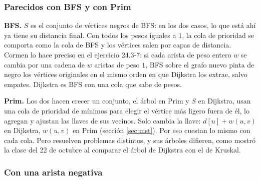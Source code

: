 \documentclass[11pt,letterpaper]{article}
\begin{document}
\subsubsection*{Parecidos con BFS y con Prim}

\textbf{BFS.} $S$ es el conjunto de vértices negros de BFS: en los
dos casos, lo que está ahí ya tiene su distancia final. Con todos los
pesos iguales a $1$, la cola de prioridad se comporta como la cola de
BFS y los vértices salen por capas de distancia. Cormen lo hace
preciso en el ejercicio 24.3-7: si cada arista de peso entero $w$ se
cambia por una cadena de $w$ aristas de peso $1$, BFS sobre el grafo
nuevo pinta de negro los vértices originales en el mismo orden en que
Dijkstra los extrae, salvo empates. Dijkstra es BFS con una cola que
sabe de pesos.

\textbf{Prim.} Los dos hacen crecer un conjunto, el árbol en Prim y
$S$ en Dijkstra, usan una cola de prioridad de mínimos para elegir el
vértice más ligero fuera de él, lo agregan y ajustan las llaves de
sus vecinos. Solo cambia la llave: $d[u] + w(u, v)$ en Dijkstra,
$w(u, v)$ en Prim (sección \ref{sec:mst}). Por eso cuestan lo mismo
con cada cola. Pero resuelven problemas distintos, y sus árboles
difieren, como mostró la clase del 22 de octubre al comparar el árbol
de Dijkstra con el de Kruskal.

\subsubsection*{Con una arista negativa}
\end{document}
